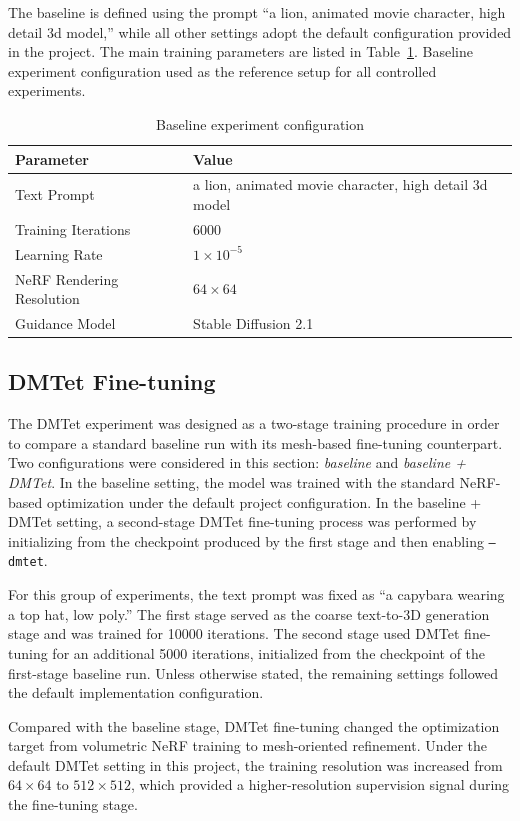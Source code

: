 \documentclass[sigconf, final, screen]{acmart}
\begin{document}
The baseline is defined using the prompt ``a lion, animated movie character, high detail 3d model,'' while all other settings adopt the default configuration provided in the project. The main training parameters are listed in Table~\ref{tab:baseline_config}. Baseline experiment configuration used as the reference setup for all controlled experiments.

\begin{table}[h]
\caption{Baseline experiment configuration}
\label{tab:baseline_config}
\centering
\begin{tabularx}{\linewidth}{lX}
\toprule
\textbf{Parameter} & \textbf{Value} \\
\midrule
Text Prompt & a lion, animated movie character, high detail 3d model \\
Training Iterations & 6000 \\
Learning Rate & $1 \times 10^{-5}$ \\
NeRF Rendering Resolution & $64 \times 64$ \\
Guidance Model & Stable Diffusion 2.1 \\
\bottomrule
\end{tabularx}
\end{table}

\subsection{DMTet Fine-tuning}
The DMTet experiment was designed as a two-stage training procedure in order to compare a standard baseline run with its mesh-based fine-tuning counterpart. Two configurations were considered in this section: \textit{baseline} and \textit{baseline + DMTet}. In the baseline setting, the model was trained with the standard NeRF-based optimization under the default project configuration. In the baseline + DMTet setting, a second-stage DMTet fine-tuning process was performed by initializing from the checkpoint produced by the first stage and then enabling \texttt{--dmtet}.

For this group of experiments, the text prompt was fixed as ``a capybara wearing a top hat, low poly.'' The first stage served as the coarse text-to-3D generation stage and was trained for 10000 iterations. The second stage used DMTet fine-tuning for an additional 5000 iterations, initialized from the checkpoint of the first-stage baseline run. Unless otherwise stated, the remaining settings followed the default implementation configuration.

Compared with the baseline stage, DMTet fine-tuning changed the optimization target from volumetric NeRF training to mesh-oriented refinement. Under the default DMTet setting in this project, the training resolution was increased from $64\times64$ to $512\times512$, which provided a higher-resolution supervision signal during the fine-tuning stage.
\end{document}
